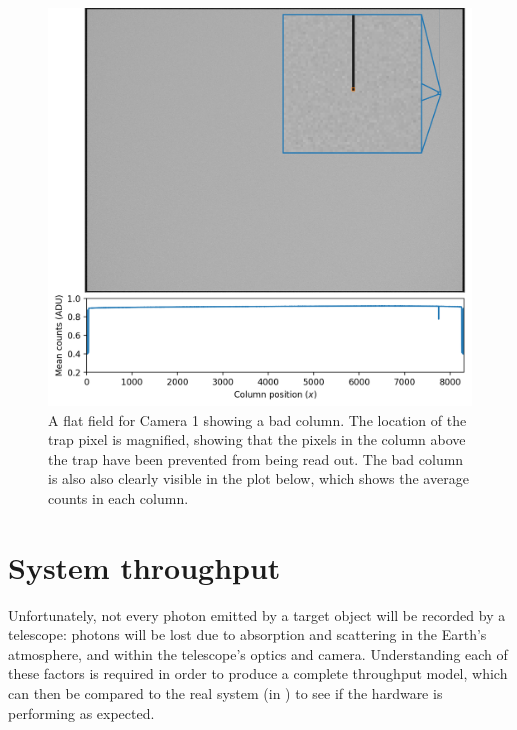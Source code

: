 \begin{colsection}
\begin{figure}[p]
    \begin{center}
        \includegraphics[width=\linewidth]{images/detectors/defect_plot.pdf}
    \end{center}
    \caption[An example of a column defect]{
        A flat field for Camera 1 showing a bad column. The location of the trap pixel is magnified, showing that the pixels in the column above the trap have been prevented from being read out. The bad column is also also clearly visible in the plot below, which shows the average counts in each column.
    }\label{fig:itsatrap}
\end{figure}

\clearpage

\end{colsection}


\section{System throughput}
\label{sec:throughput}


\begin{colsection}

Unfortunately, not every photon emitted by a target object will be recorded by a telescope: photons will be lost due to absorption and scattering in the Earth's atmosphere, and within the telescope's optics and camera. Understanding each of these factors is required in order to produce a complete throughput model, which can then be compared to the real system (in ) to see if the hardware is performing as expected.

\end{colsection}


